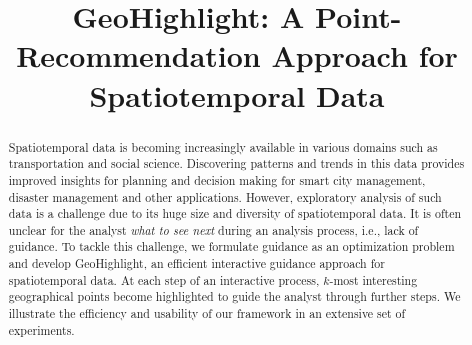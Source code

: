 \documentclass{sig-alternate-05-2015}
\begin{document}




\newtheorem{problem}{Problem}
\newtheorem{definition}{Definition}
\newtheorem{example}{Example}

\newcommand{\framework}{{\sc GeoHighlight}}
\newcommand{\pb}{{\sc GeoGuide}}

 





\title{GeoHighlight: A Point-Recommendation Approach for Spatiotemporal Data}





\maketitle
\begin{abstract}
Spatiotemporal data is becoming increasingly available in various domains such as transportation and social science. Discovering patterns and trends in this data provides improved insights for planning and decision making for smart city management, disaster management and other applications. However, exploratory analysis of such data is a challenge due to its huge size and diversity of spatiotemporal data. It is often unclear for the analyst {\em what to see next} during an analysis process, i.e., lack of guidance. To tackle this challenge, we formulate guidance as an optimization problem and develop \framework, an efficient interactive guidance approach for spatiotemporal data. At each step of an interactive process, $k$-most interesting geographical points become highlighted to guide the analyst through further steps. We illustrate the efficiency and usability of our framework in an extensive set of experiments.
\end{abstract}








% 
\newpage




 
\end{document}

